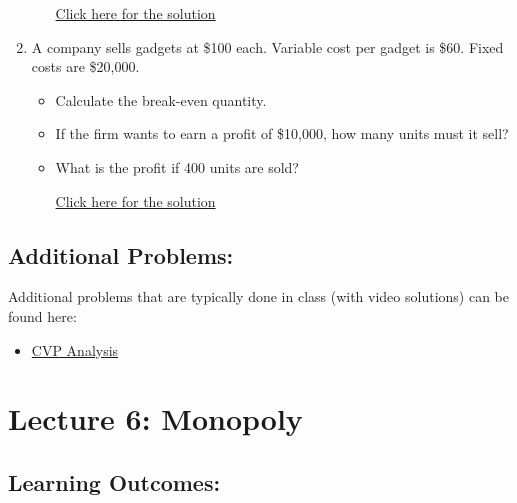 \documentclass[
]{book}
\providecommand{\tightlist}{%
  \setlength{\itemsep}{0pt}\setlength{\parskip}{0pt}}
\begin{document}
\begin{enumerate}
\begin{itemize}
    \href{https://youtu.be/ONvoWKJxvLM}{Click here for the solution}
  \end{itemize}
\item
  A company sells gadgets at \$100 each. Variable cost per gadget is \$60. Fixed costs are \$20,000.

  \begin{itemize}
  \tightlist
  \item
    Calculate the break-even quantity.
  \item
    If the firm wants to earn a profit of \$10,000, how many units must it sell?
  \item
    What is the profit if 400 units are sold?

    \href{https://youtu.be/1zNOrzrwmXo}{Click here for the solution}
  \end{itemize}
\end{enumerate}

\subsection*{Additional Problems:}\label{additional-problems-4}

Additional problems that are typically done in class (with video solutions) can be found here:

\begin{itemize}
\tightlist
\item
  \href{https://theelementsmath.github.io/M114/business-economics.html\#cvp-analysis}{CVP Analysis}
\end{itemize}

\section*{Lecture 6: Monopoly}\label{lecture-6-monopoly}

\subsection*{Learning Outcomes:}\label{learning-outcomes-5}
\end{document}
